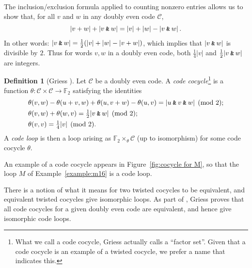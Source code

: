 \documentclass{article}
\theoremstyle{plain}
\theoremstyle{definition}
\newtheorem*{definition}{Definition}
\def \cC {\mathcal{C}}
\def \FF {\mathbb{F}}
\newcommand{\AND}{\mathbin{\textup{\texttt{\&}}}}
\begin{document}
The inclusion/exclusion formula applied to counting nonzero entries allows us to show that, for all $v$ and $w$ in any doubly even code $\cC$,
\[
	|v+w| + |v\AND w| = |v| + |w| - |v\AND w|\,.
\]
In other words: $|v\AND w| = \frac12(|v| + |w| - |v+w|)$, which implies that $|v\AND w|$ is divisible by $2$.
Thus for words $v,w$ in a doubly even code, both $\frac14|v|$ and $\frac12|v\AND w|$ are integers.

\begin{definition}[Griess \cite{Griess}]
Let $\cC$ be a doubly even code. 
A \emph{code cocycle}\footnote{What we call a code cocycle, Griess actually calls a ``factor set''. Given that a code cocycle is an example of a twisted cocycle, we prefer a name that indicates this.} is a function $\theta\colon \cC \times \cC \to \FF_2$ satisfying the identities
\begin{align}
& \theta(v,w)-\theta(u+v,w)+\theta(u,v+w)-\theta(u,v) =|u\AND v \AND w| \pmod 2; \label{eq: code cocycle 1}\\
& \theta(v,w)+\theta(w,v) = {}  \tfrac12|v\AND w| \pmod 2; \label{eq: code cocycle 2}\\
& \theta(v,v) = {}  \tfrac14|v| \pmod 2.\label{eq: code cocycle 3}
\end{align}
A \emph{code loop} is then a loop arising as $\FF_2\times_\theta \cC$ (up to isomorphism) for some code cocycle $\theta$.
\end{definition}

An example of a code cocycle appears in Figure~\ref{fig:cocycle for M}, so that the loop $M$ of Example~\ref{example:m16} is a code loop.

There is a notion of what it means for two twisted cocycles to be equivalent, and equivalent twisted cocycles give isomorphic loops.
As part of \cite[Theorem 10]{Griess}, Griess proves that all code cocycles for a given doubly even code are equivalent, and hence give isomorphic code loops. 

\end{document}

